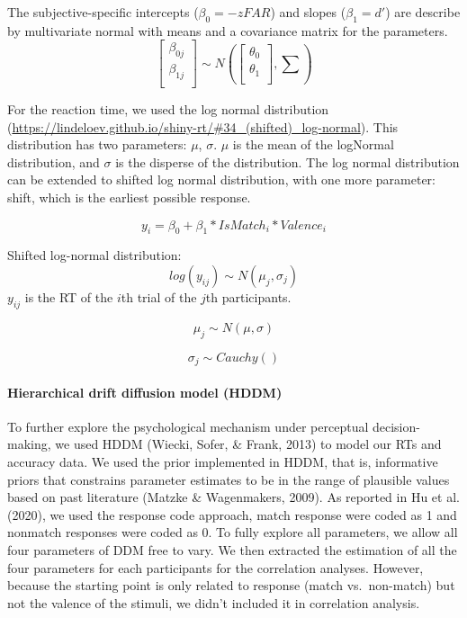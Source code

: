 \documentclass[
  english,
  man]{apa6}
\let\oldparagraph\paragraph
\renewcommand{\paragraph}[1]{\oldparagraph{#1}\mbox{}}
\begin{document}
The subjective-specific intercepts (\(\beta_{0} = -zFAR\)) and slopes (\(\beta_{1} = d'\)) are describe by multivariate normal with means and a covariance matrix for the parameters.
\[ \begin{bmatrix}\beta_{0j}\\
\beta_{1j}\\
\end{bmatrix} \sim N(\begin{bmatrix}\theta_{0}\\
\theta_{1}\\
\end{bmatrix}, \sum) \]

For the reaction time, we used the log normal distribution (\url{https://lindeloev.github.io/shiny-rt/\#34_(shifted)_log-normal}). This distribution has two parameters: \(\mu\), \(\sigma\). \(\mu\) is the mean of the logNormal distribution, and \(\sigma\) is the disperse of the distribution. The log normal distribution can be extended to shifted log normal distribution, with one more parameter: shift, which is the earliest possible response.

\[y_{i} = \beta_{0} + \beta_{1}*IsMatch_{i} * Valence_{i}\]

Shifted log-normal distribution:
\[ log(y_{ij}) \sim N(\mu_{j}, \sigma_{j})\]
\(y_{ij}\) is the RT of the \(i\)th trial of the \(j\)th participants.

\[\mu_{j} \sim N(\mu, \sigma)\]

\[\sigma_{j} \sim Cauchy()\]

\hypertarget{hierarchical-drift-diffusion-model-hddm}{%
\paragraph{Hierarchical drift diffusion model (HDDM)}\label{hierarchical-drift-diffusion-model-hddm}}

To further explore the psychological mechanism under perceptual decision-making, we used HDDM (Wiecki, Sofer, \& Frank, 2013) to model our RTs and accuracy data. We used the prior implemented in HDDM, that is, informative priors that constrains parameter estimates to be in the range of plausible values based on past literature (Matzke \& Wagenmakers, 2009). As reported in Hu et al. (2020), we used the response code approach, match response were coded as 1 and nonmatch responses were coded as 0. To fully explore all parameters, we allow all four parameters of DDM free to vary. We then extracted the estimation of all the four parameters for each participants for the correlation analyses. However, because the starting point is only related to response (match vs.~non-match) but not the valence of the stimuli, we didn't included it in correlation analysis.
\end{document}
